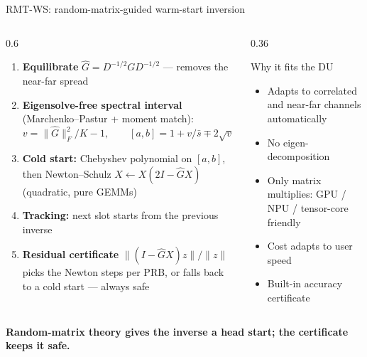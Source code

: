 \documentclass[aspectratio=169,11pt,xcolor=table]{beamer}
\newcommand{\takeaway}[1]{%
  \vfill
  \begin{alertblock}{}\centering\textbf{#1}\end{alertblock}}
\begin{document}
\begin{frame}{RMT-WS: random-matrix-guided warm-start inversion}
  \begin{columns}[T]
    \begin{column}{0.6\textwidth}
      \begin{enumerate}\small
        \item \textbf{Equilibrate} $\hat G = D^{-1/2} G D^{-1/2}$ --- removes the near-far spread
        \item \textbf{Eigensolve-free spectral interval} (Marchenko--Pastur + moment match):
          \[ v = \|\hat G\|_F^2/K - 1, \qquad [a,b] = 1 + v/\bar s \mp 2\sqrt{v} \quad (K^2 \text{ work}) \]
        \item \textbf{Cold start:} Chebyshev polynomial on $[a,b]$, then Newton--Schulz
          $X \leftarrow X(2I - \hat G X)$ (quadratic, pure GEMMs)
        \item \textbf{Tracking:} next slot starts from the previous inverse
        \item \textbf{Residual certificate} $\|(I - \hat G X)z\|/\|z\|$ picks the Newton steps
          per PRB, or falls back to a cold start --- always safe
      \end{enumerate}
    \end{column}
    \begin{column}{0.36\textwidth}
      \begin{exampleblock}{Why it fits the DU}
        \begin{itemize}\small
          \item[\checkmark] Adapts to correlated and near-far channels automatically
          \item[\checkmark] No eigen-decomposition
          \item[\checkmark] Only matrix multiplies: GPU / NPU / tensor-core friendly
          \item[\checkmark] Cost adapts to user speed
          \item[\checkmark] Built-in accuracy certificate
        \end{itemize}
      \end{exampleblock}
    \end{column}
  \end{columns}
  \takeaway{Random-matrix theory gives the inverse a head start; the certificate keeps it safe.}
\end{frame}
\end{document}
